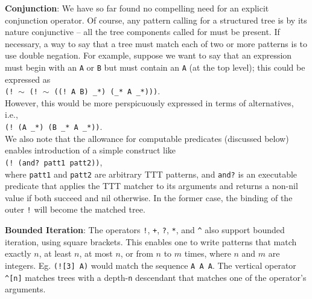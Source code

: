 \documentclass[a4,11pt]{article}
\begin{document}
{\bf Conjunction}:
We have so far found no compelling need for an explicit conjunction operator. Of course, any pattern calling for a structured tree is by its nature conjunctive -- all the tree components called for must be present. If necessary, a way to say that a tree must match each of two or more patterns is to use double negation. For example, suppose we want to say that an expression must begin with an \texttt{A} or \texttt{B} but must contain an \texttt{A} (at the top level); this could be expressed as \\
\small
\hspace{1em} {\tt (!$\;\sim\;$(!$\;\sim\;$((!~A B) \_*) (\_* A \_*)))}.\\
\normalsize
However, this would be more perspicuously expressed in terms of alternatives, i.e.,\\
\small
\hspace{1em} {\tt (!~(A \_*) (B \_* A \_*))}.\\  %
\normalsize
We also note that the allowance for computable predicates (discussed below) enables introduction of a simple construct like\\
\hspace{3em} {\tt (!~(and?~patt1 patt2))},\\
 where \texttt{patt1} and \texttt{patt2} are arbitrary TTT patterns, and \texttt{and?} is an executable predicate that applies the TTT matcher to its arguments and returns a non-nil value if both succeed and nil otherwise. In the former case, the binding of the outer \texttt{!} will become the matched tree.

{\bf Bounded Iteration}:
The operators \texttt{!}, \texttt{+}, \texttt{?}, \texttt{*}, and \texttt{\^} also support bounded iteration, using square brackets.  This enables one to write patterns that match exactly $n$, at least $n$, at most $n$, or from $n$ to $m$ times, where $n$ and $m$ are integers.   Eg. \texttt{(![3] A)} would match the sequence \texttt{A A A}. The vertical operator {\small\tt \^{}[n]} matches trees with a depth-\texttt{n} descendant that matches one of the operator's arguments.

\end{document}
